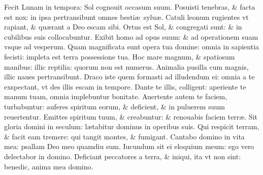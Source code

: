 \documentclass[a5paper,10pt]{book}
\def\ae{æ}
\begin{document}
\begin{multicols*}{2}
\newline \color{red} F\color{black}ecit Lunam in tempora: Sol cognouit occasum suum.
\newline \color{red} P\color{black}osuisti tenebras, \& facta est nox: in ipsa pertransibunt omnes besti\ae \ sylu\ae .
\newline \color{red} C\color{black}atuli leonum rugientes vt rapiant, \& qu\ae rant a Deo escam sibi.
\newline \color{red} O\color{black}rtus est Sol, \& congregati sunt: \& in cubilibus suis collocabuntur.
\newline \color{red} E\color{black}xibit homo ad opus suum: \& ad operationem suam vsque ad vesperum.
\newline \color{red} Q\color{black}uam magnificata sunt opera tua domine: omnia in sapientia fecisti: impleta est terra possessione tua.
\newline \color{red} H\color{black}oc mare magnum, \& spatiosum manibus: illic reptilia: quorum non est numerus.
\newline \color{red} A\color{black}nimalia pusilla cum magnis, illic naues pertransibunt.
\newline \color{red} D\color{black}raco iste quem formasti ad illudendum ei: omnia a te exspectant, vt des illis escam in tempore.
\newline \color{red} D\color{black}ante te illis, colligent: aperiente te manum tuam, omnia implebuntur bonitate.
\newline \color{red} A\color{black}uertente autem te faciem, turbabuntur: auferes spiritum eorum, \& deficient, \& in puluerem suum reuertentur.
\newline \color{red} E\color{black}mittes spiritum tuum, \& creabuntur: \& renouabis faciem terr\ae .
\newline \color{red} S\color{black}it gloria domini in seculum: l\ae tabitur dominus in operibus suis.
\newline \color{red} Q\color{black}ui respicit terram, \& facit eam tremere: qui tangit montes, \& fumigant.
\newline \color{red} C\color{black}antabo domino in vita mea: psallam Deo meo quamdiu sum.
\newline \color{red} I\color{black}ucundum sit ei eloquium meum: ego vero delectabor in domino.
\newline \color{red} D\color{black}eficiant peccatores a terra, \& iniqui, ita vt non sint: benedic, anima mea domino.
\vspace{-1em}

\end{multicols*}
\end{document}
